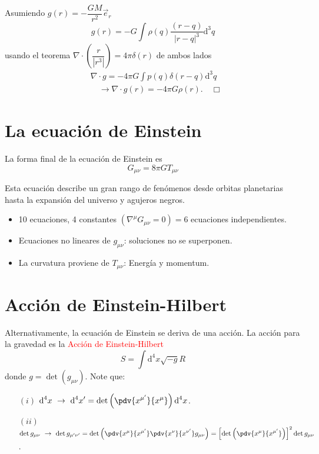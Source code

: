 \documentclass[../main]{subfiles}
\begin{document}
Asumiendo $g(r)=-\dfrac{GM}{r^2}\vec{e}_r$
\begin{equation}
    g(r)=-G\int \rho(q) \dfrac{(r-q)}{|r-q|^3}\mathrm{d}^3 q
\end{equation}
usando el teorema $\nabla \cdot \left(\dfrac{r}{|r^3|}\right)=4\pi \delta(r)$ de ambos lados 
\begin{equation}
    \begin{split}
        &\nabla \cdot g= -4\pi G \int p(q)\delta(r-q)\mathrm{d}^3 q \\
        &\quad \rightarrow \nabla \cdot g(r)=-4\pi G\rho(r). \quad \Box
    \end{split}
\end{equation}

\section{La ecuación de Einstein}

La forma final de la ecuación de Einstein es 
\begin{equation}
    G_{\mu\nu}=8\pi G T_{\mu\nu}
\end{equation}

Esta ecuación describe un gran rango de fenómenos desde orbitas planetarias hasta la expansión del universo y agujeros negros.
\begin{itemize}
    \item 10 ecuaciones, 4 constantes $(\nabla^{\mu} G_{\mu\nu}=0)=6$ ecuaciones independientes.
    \item Ecuaciones no lineares de $g_{\mu\nu}$: soluciones no se superponen.
    \item La curvatura proviene de $T_{\mu\nu}$: Energía y momentum.
\end{itemize}

\section{Acción de Einstein-Hilbert}

Alternativamente, la ecuación de Einstein se deriva de una acción. La acción para la gravedad es la \textcolor{red}{Acción de Einstein-Hilbert}
\begin{equation}
    S=\int \mathrm{d}^4 x \sqrt{-g} R
\end{equation}
donde $g=\det(g_{\mu\nu})$. Note que:
\begin{enumerate}
    \item[$(i)$] $\displaystyle \mathrm{d}^4 x \ \rightarrow \ \mathrm{d}^4 x'=\det\left(\pdv{x^{\mu'}}{x^{\mu}}\right)\mathrm{d}^4 x$.
    \item[$(ii)$] $\displaystyle \det g_{\mu\nu} \ \rightarrow \ \det g_{\mu'\nu'}=\det\left(\pdv{x^{\mu}}{x^{\mu'}}\pdv{x^{\nu}}{x^{\nu'}} g_{\mu\nu}\right)=\left[\det\left(\pdv{x^{\mu}}{x^{\mu'}}\right)\right]^2 \det g_{\mu\nu}$.  
\end{enumerate}
\end{document}
